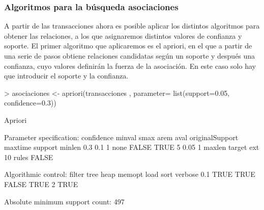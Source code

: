 \documentclass [a4paper] {article}
\begin{document}
\subsubsection{Algoritmos para la búsqueda asociaciones}
A partir de las transacciones ahora es posible aplicar los distintos algoritmos para obtener las relaciones, a los que asignaremos distintos valores de confianza y soporte.
El primer algoritmo que aplicaremos es el apriori, en el que a partir de una serie de pasos obtiene relaciones candidatas según un soporte y después una confianza, cuyo valores
definirán la fuerza de la asociación. En este caso solo hay que introducir el soporte y la confianza.
\begin{Schunk}
\begin{Sinput}
> asociaciones <- apriori(transacciones , parameter= list(support=0.05, confidence=0.3))
\end{Sinput}
\begin{Soutput}
Apriori

Parameter specification:
 confidence minval smax arem  aval originalSupport maxtime support minlen
        0.3    0.1    1 none FALSE            TRUE       5    0.05      1
 maxlen target   ext
     10  rules FALSE

Algorithmic control:
 filter tree heap memopt load sort verbose
    0.1 TRUE TRUE  FALSE TRUE    2    TRUE

Absolute minimum support count: 497 


\end{Soutput}
\end{Schunk}
\end{document}
